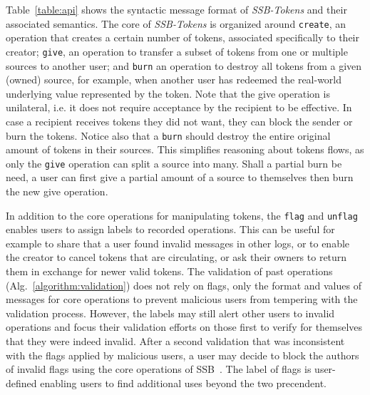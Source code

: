 \documentclass[sigplan,screen,10pt]{acmart}
\newcommand\ssbtokens[0]{\textit{SSB-Tokens} }
\begin{document}
Table~\ref{table:api} shows the syntactic message format of \ssbtokens and their associated semantics. The core of \ssbtokens is organized around \texttt{create}, an operation that creates a certain number of tokens, associated specifically to their creator; \texttt{give}, an operation to transfer a subset of tokens from one or multiple sources to another user; and \texttt{burn} an operation to destroy all tokens from a given (owned) source, for example, when another user has redeemed the real-world underlying value represented by the token.  Note that the give operation is unilateral, i.e. it does not require acceptance by the recipient to be effective. In case a recipient receives tokens they did not want, they can block the sender or burn the tokens. Notice also that a \texttt{burn} should destroy the entire original amount of tokens in their sources. This simplifies reasoning about tokens flows, as only the \texttt{give} operation can split a source into many. Shall a partial burn be need, a user can first give a partial amount of a source to themselves then burn the new give operation.

In addition to the core operations for manipulating tokens, the \texttt{flag} and \texttt{unflag} enables users to assign labels to recorded operations. This can be useful for example to share that a user found invalid messages in other logs, or to enable the creator to cancel tokens that are circulating, or ask their owners to return them in exchange for newer valid tokens. The validation of past operations (Alg.~\ref{algorithm:validation}) does not rely on flags, only the format and values of messages for core operations to prevent malicious users from tempering with the validation process. However, the labels may still alert other users to invalid operations and focus their validation efforts on those first to verify for themselves that they were indeed invalid. After a second validation that was inconsistent with the flags applied by malicious users, a user may decide to block the authors of invalid flags using the core operations of SSB~\cite{kermarrec2020gossiping}. The label of flags is user-defined enabling users to find additional uses beyond the two precendent.

\end{document}
